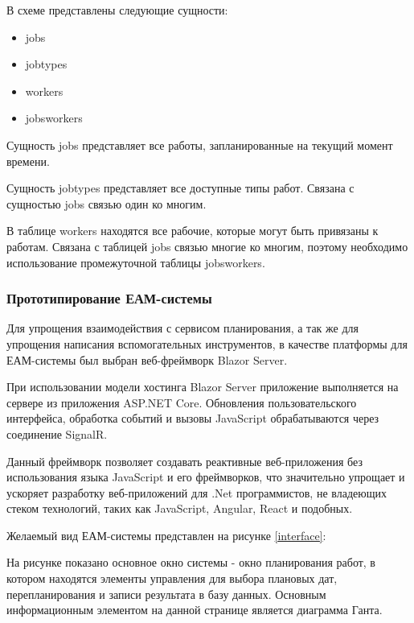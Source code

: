 
В схеме представлены следующие сущности:
\begin{itemize}
	\item jobs
	\item jobtypes
	\item workers
	\item jobsworkers
\end{itemize}

Сущность jobs представляет все работы, запланированные на текущий момент времени.

Сущность jobtypes представляет все доступные типы работ. Связана с сущностью jobs связью один ко многим.

В таблице workers находятся все рабочие, которые могут быть привязаны к работам. Связана с таблицей jobs связью многие ко многим, поэтому необходимо использование промежуточной таблицы jobsworkers.

\subsubsection{Прототипирование ЕАМ-системы}

Для упрощения взаимодействия с сервисом планирования, а так же для упрощения написания вспомогательных инструментов, в качестве платформы для ЕАМ-системы был выбран веб-фреймворк Blazor Server.

При использовании модели хостинга Blazor Server приложение выполняется на сервере из приложения ASP.NET Core. Обновления пользовательского интерфейса, обработка событий и вызовы JavaScript обрабатываются через соединение SignalR.

Данный фреймворк позволяет создавать реактивные веб-приложения без использования языка JavaScript и его фреймворков, что значительно упрощает и ускоряет разработку веб-приложений для .Net программистов, не владеющих стеком технологий, таких как JavaScript, Angular, React и подобных.

Желаемый вид ЕАМ-системы представлен на рисунке \ref{interface}:


На рисунке показано основное окно системы - окно планирования работ, в котором находятся элементы управления для выбора плановых дат, перепланирования и записи результата в базу данных. Основным информационным элементом на данной странице является диаграмма Ганта.

